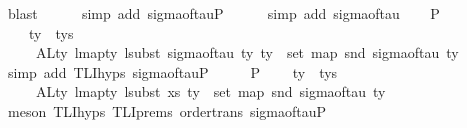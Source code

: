 \begin{isabellebody}
\ blast\isanewline
\ \ \ \ \isamarkupfalse%
\ {\isacharparenleft}{\kern0pt}simp\ add{\isacharcolon}{\kern0pt}\ sigma{\isacharunderscore}{\kern0pt}of{\isacharunderscore}{\kern0pt}tau{\isacharunderscore}{\kern0pt}P{}{\isacharparenright}{\kern0pt}\isanewline
\ \ \ \ \isamarkupfalse%
\ {\isacharparenleft}{\kern0pt}simp\ add{\isacharcolon}{\kern0pt}\ sigma{\isacharunderscore}{\kern0pt}of{\isacharunderscore}{\kern0pt}tau{\isacharparenright}{\kern0pt}\isanewline
\isanewline
\ \ \isamarkupfalse%
\ P{}{\isacharcolon}{\kern0pt}\isanewline
\ \ \ \ {\isachardoublequoteopen}{\isasymforall}ty\ {\isasymin}{\isacharhash}{\kern0pt}\ tys{\isachardot}{\kern0pt}\isanewline
\ \ \ \ \ ALty\ {\isacharparenleft}{\kern0pt}lmap{\isacharunderscore}{\kern0pt}ty\ {\isacharparenleft}{\kern0pt}lsubst\ {\isacharparenleft}{\kern0pt}sigma{\isacharunderscore}{\kern0pt}of{\isacharunderscore}{\kern0pt}tau\ ty{\isacharparenright}{\kern0pt}{\isacharparenright}{\kern0pt}\ ty{\isacharparenright}{\kern0pt}\ {\isacharequal}{\kern0pt}\ set\ {\isacharparenleft}{\kern0pt}map\ snd\ {\isacharparenleft}{\kern0pt}sigma{\isacharunderscore}{\kern0pt}of{\isacharunderscore}{\kern0pt}tau\ ty{\isacharparenright}{\kern0pt}{\isacharparenright}{\kern0pt}{\isachardoublequoteclose}\isanewline
\ \ \ \ \isamarkupfalse%
\ {\isacharparenleft}{\kern0pt}simp\ add{\isacharcolon}{\kern0pt}\ TLI{\isachardot}{\kern0pt}hyps\ sigma{\isacharunderscore}{\kern0pt}of{\isacharunderscore}{\kern0pt}tau{\isacharunderscore}{\kern0pt}P{}{\isacharparenright}{\kern0pt}\isanewline
\ \ \isamarkupfalse%
\ \isamarkupfalse%
\ P{}{\isacharcolon}{\kern0pt}\isanewline
\ \ \ \ {\isachardoublequoteopen}{\isasymforall}ty\ {\isasymin}{\isacharhash}{\kern0pt}\ tys{\isachardot}{\kern0pt}\isanewline
\ \ \ \ \ ALty\ {\isacharparenleft}{\kern0pt}lmap{\isacharunderscore}{\kern0pt}ty\ {\isacharparenleft}{\kern0pt}lsubst\ xs{\isacharparenright}{\kern0pt}\ ty{\isacharparenright}{\kern0pt}\ {\isacharequal}{\kern0pt}\ set\ {\isacharparenleft}{\kern0pt}map\ snd\ {\isacharparenleft}{\kern0pt}sigma{\isacharunderscore}{\kern0pt}of{\isacharunderscore}{\kern0pt}tau\ ty{\isacharparenright}{\kern0pt}{\isacharparenright}{\kern0pt}{\isachardoublequoteclose}\isanewline
\ \ \ \ \isamarkupfalse%
\ {\isacharparenleft}{\kern0pt}meson\ TLI{\isachardot}{\kern0pt}hyps\ TLI{\isachardot}{\kern0pt}prems{\isacharparenleft}{\kern0pt}{}{\isacharparenright}{\kern0pt}\ order{\isacharunderscore}{\kern0pt}trans\ sigma{\isacharunderscore}{\kern0pt}of{\isacharunderscore}{\kern0pt}tau{\isacharunderscore}{\kern0pt}P{}\isanewline

\end{isabellebody}
